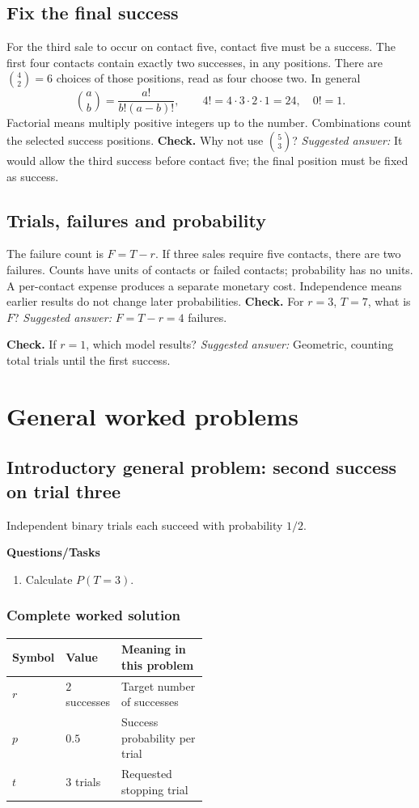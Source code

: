 \subsection{Fix the final success}
For the third sale to occur on contact five, contact five must be a success. The first four contacts contain exactly two successes, in any positions. There are $\binom42=6$ choices of those positions, read as four choose two. In general
\[\binom ab=\frac{a!}{b!(a-b)!},\qquad4!=4\cdot3\cdot2\cdot1=24,\quad0!=1.\]
Factorial means multiply positive integers up to the number. Combinations count the selected success positions.
\textbf{Check.} Why not use $\binom53$? \emph{Suggested answer:} It would allow the third success before contact five; the final position must be fixed as success.


\subsection{Trials, failures and probability}
The failure count is $F=T-r$. If three sales require five contacts, there are two failures. Counts have units of contacts or failed contacts; probability has no units. A per-contact expense produces a separate monetary cost. Independence means earlier results do not change later probabilities.
\textbf{Check.} For $r=3$, $T=7$, what is $F$? \emph{Suggested answer:} $F=T-r=4$ failures.

\textbf{Check.} If $r=1$, which model results? \emph{Suggested answer:} Geometric, counting total trials until the first success.

\section{General worked problems}
\subsection{Introductory general problem: second success on trial three}
Independent binary trials each succeed with probability $1/2$.

\textbf{Questions/Tasks}
\begin{enumerate}
\item Calculate $P(T=3)$. 
\end{enumerate}
\subsubsection*{Complete worked solution}
\begin{center}
\begin{tabular}{llp{0.48\linewidth}}
\toprule
Symbol & Value & Meaning in this problem \\ \midrule
$r$ & $2$ successes & Target number of successes \\
$p$ & $0.5$ & Success probability per trial \\
$t$ & $3$ trials & Requested stopping trial \\
\bottomrule
\end{tabular}
\end{center}

